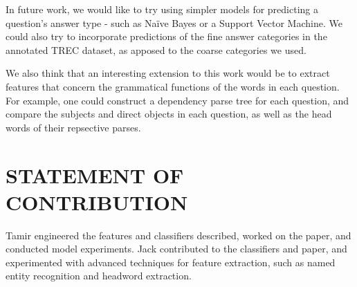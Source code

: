 \documentclass[letterpaper, 10 pt, conference]{ieeeconf}  %
\begin{document}
In future work, we would like to try using simpler models for predicting a question's answer type - such as Naïve Bayes or a Support Vector Machine. We could also try to incorporate predictions of the fine answer categories in the annotated TREC dataset, as apposed to the coarse categories we used. 

We also think that an interesting extension to this work would be to extract features that concern the grammatical functions of the words in each question. For example, one could construct a dependency parse tree for each question, and compare the subjects and  direct objects in each question, as well as the head words of their repsective parses.

\addtolength{\textheight}{-12cm}   %









\section{STATEMENT OF CONTRIBUTION}

Tamir engineered the features and classifiers described, worked on the paper, and conducted model experiments. Jack contributed to the classifiers and paper, and experimented with advanced techniques for feature extraction, such as named entity recognition and headword extraction. 
\end{document}
